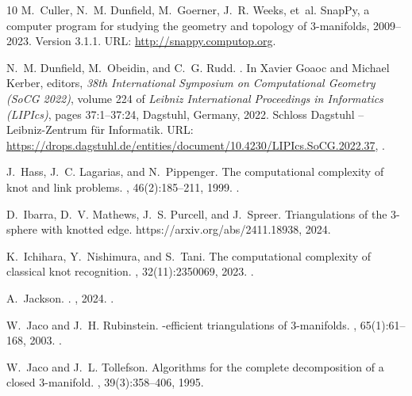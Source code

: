 \documentclass[10pt,a4paper]{amsart}
\begin{document}
\begin{thebibliography}{10}
M.~Culler, N.~M. Dunfield, M.~Goerner, J.~R. Weeks, et~al.
\newblock Snap{P}y, a computer program for studying the geometry and topology
  of $3$-manifolds, 2009--2023.
\newblock Version 3.1.1.
\newblock URL: \url{http://snappy.computop.org}.

N.~M. Dunfield, M.~Obeidin, and C.~G. Rudd.
.
\newblock In Xavier Goaoc and Michael Kerber, editors, {\em 38th International
  Symposium on Computational Geometry (SoCG 2022)}, volume 224 of {\em Leibniz
  International Proceedings in Informatics (LIPIcs)}, pages 37:1--37:24,
  Dagstuhl, Germany, 2022. Schloss Dagstuhl -- Leibniz-Zentrum f{\"u}r
  Informatik.
\newblock URL:
  \url{https://drops.dagstuhl.de/entities/document/10.4230/LIPIcs.SoCG.2022.37},
  \href {https://doi.org/10.4230/LIPIcs.SoCG.2022.37}
  {}.

J.~Hass, J.~C. Lagarias, and N.~Pippenger.
\newblock The computational complexity of knot and link problems.
, 46(2):185--211, 1999.
\newblock \href {https://doi.org/10.1145/301970.301971}
  {}.

D.~Ibarra, D.~V. Mathews, J.~S. Purcell, and J.~Spreer.
\newblock Triangulations of the $3$-sphere with knotted edge.
\newblock https://arxiv.org/abs/2411.18938, 2024.

K.~Ichihara, Y.~Nishimura, and S.~Tani.
\newblock The computational complexity of classical knot recognition.
, 32(11):2350069,
  2023.
\newblock \href {https://doi.org/10.1142/S0218216523500694}
  {}.

A.~Jackson.
.
, 2024.
\newblock \href {https://doi.org/10.1007/s00208-024-02920-x}
  {}.

W.~Jaco and J.~H. Rubinstein.
-efficient triangulations of 3-manifolds.
, 65(1):61--168, 2003.
\newblock \href {https://doi.org/10.4310/jdg/1090503053}
  {}.

W.~Jaco and J.~L. Tollefson.
\newblock Algorithms for the complete decomposition of a closed {$3$}-manifold.
, 39(3):358--406, 1995.


\end{thebibliography}
\end{document}
